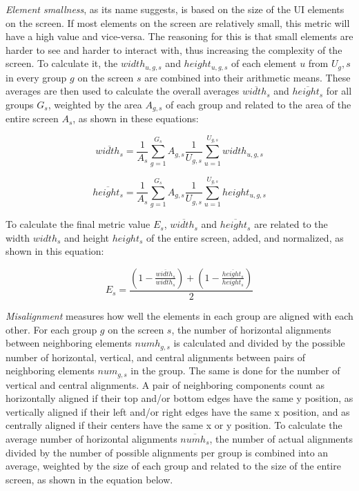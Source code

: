 \documentclass[11pt,titlepage,oneside,openany]{book}
\begin{document}
\emph{Element smallness}, as its name suggests, is based on the size of the UI elements on the screen. If most elements on the screen are relatively small, this metric will have a high value and vice-versa. The reasoning for this is that small elements are harder to see and harder to interact with, thus increasing the complexity of the screen. To calculate it, the  $width_{u,g,s}$ and $height_{u,g,s}$ of each element $u$ from $U{_g,s}$ in every group $g$ on the screen $s$ are combined into their arithmetic means. These averages are then used to calculate the overall averages $\overline{width_s}$ and $\overline{height_s}$ for all groups $G_s$, weighted by the area $A_{g,s}$ of each group and related to the area of the entire screen $A_s$, as shown in these equations:

\begin{equation}
	\overline{width_s} = \frac{1}{A_s} \sum_{g=1}^{G_s} A_{g,s} \frac{1}{U_{g,s}} \sum_{u=1}^{U_{g,s}} width_{u,g,s}
\end{equation}

\begin{equation}
	\overline{height_s} = \frac{1}{A_s} \sum_{g=1}^{G_s} A_{g,s} \frac{1}{U_{g,s}} \sum_{u=1}^{U_{g,s}} height_{u,g,s}
\end{equation}

To calculate the final metric value $E_s$, $\overline{width_s}$ and $\overline{height_s}$ are related to the width $width_s$ and height $height_s$ of the entire screen, added, and normalized, as shown in this equation:

\begin{equation}
	E_s = \frac{\left( 1 - \frac{\overline{width_s}}{width_s} \right) + \left( 1 - \frac{\overline{height_s}}{height_s} \right)}{2}
\end{equation}

\emph{Misalignment} measures how well the elements in each group are aligned with each other. For each group $g$ on the screen $s$, the number of horizontal alignments between neighboring elements $numh_{g,s}$ is calculated and divided by the possible number of horizontal, vertical, and central alignments between pairs of neighboring elements $num_{g,s}$ in the group. The same is done for the number of vertical and central alignments. A pair of neighboring components count as horizontally aligned if their top and/or bottom edges have the same y position, as vertically aligned if their left and/or right edges have the same x position, and as centrally aligned if their centers have the same x or y position. To calculate the average number of horizontal alignments $\overline{numh_s}$, the number of actual alignments divided by the number of possible alignments per group is combined into an average, weighted by the size of each group and related to the size of the entire screen, as shown in the equation below.
\end{document}
